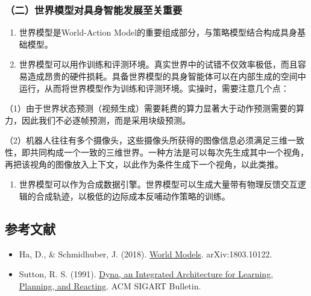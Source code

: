 \hypertarget{ux4e8cux4e16ux754cux6a21ux578bux5bf9ux5177ux8eabux667aux80fdux53d1ux5c55ux81f3ux5173ux91cdux8981}{%
\subsubsection{（二）世界模型对具身智能发展至关重要}\label{ux4e8cux4e16ux754cux6a21ux578bux5bf9ux5177ux8eabux667aux80fdux53d1ux5c55ux81f3ux5173ux91cdux8981}}

\begin{enumerate}
\def\labelenumi{\arabic{enumi}.}
\item
  世界模型是World-Action Model的重要组成部分，与策略模型结合构成具身基础模型。
\item
  世界模型可以用作训练和评测环境。真实世界中的试错不仅效率极低，而且容易造成昂贵的硬件损耗。具备世界模型的具身智能体可以在内部生成的空间中运行，从而将世界模型作为训练和评测环境。实操时，需要注意几个点：
\end{enumerate}

（1）由于世界状态预测（视频生成）需要耗费的算力显著大于动作预测需要的算力，因此我们不必逐帧预测，而是采用块级预测。

（2）机器人往往有多个摄像头，这些摄像头所获得的图像信息必须满足三维一致性，即共同构成一个一致的三维世界。一种方法是可以每次先生成其中一个视角，再把该视角的图像放入上下文，以此作为条件生成下一个视角，以此类推。

\begin{enumerate}
\def\labelenumi{\arabic{enumi}.}
\setcounter{enumi}{2}
\tightlist
\item
  世界模型可以作为合成数据引擎。世界模型可以生成大量带有物理反馈交互逻辑的合成轨迹，以极低的边际成本反哺动作策略的训练。
\end{enumerate}

\hypertarget{ux53c2ux8003ux6587ux732e-154}{%
\subsection{参考文献}\label{ux53c2ux8003ux6587ux732e-154}}

\vspace{0.25em}
\begin{itemize}
\tightlist
\item
  Ha, D., \& Schmidhuber, J. (2018). \href{https://arxiv.org/abs/1803.10122}{World Models}. arXiv:1803.10122.
\item
  Sutton, R. S. (1991). \href{https://dl.acm.org/doi/10.1145/122344.122377}{Dyna, an Integrated Architecture for Learning, Planning, and Reacting}. ACM SIGART Bulletin.
\end{itemize}

